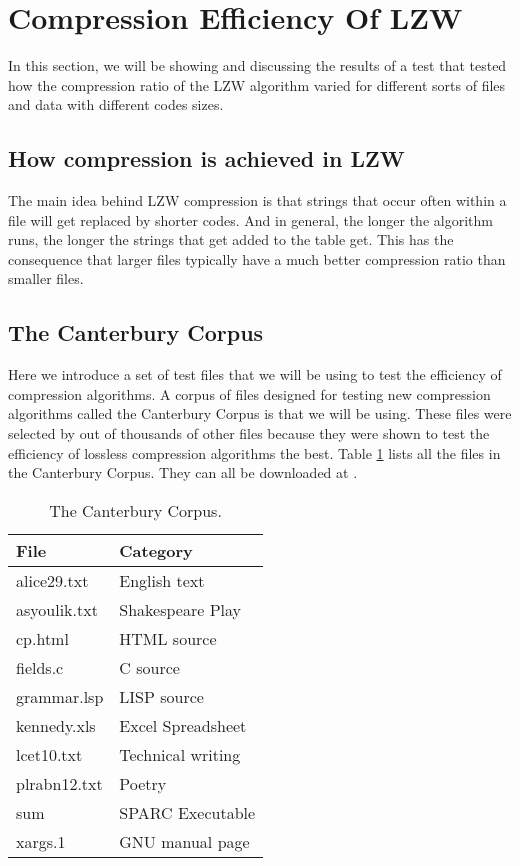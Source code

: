 \section{Compression Efficiency Of LZW}

In this section, we will be showing and discussing the results of a
test that tested how the compression ratio of the LZW algorithm varied
for different sorts of files and data with different codes sizes.

\subsection{How compression is achieved in LZW}

The main idea behind LZW compression is that strings that occur often
within a file will get replaced by shorter codes. And in general, the
longer the algorithm runs, the longer the strings that get added to
the table get. This has the consequence that larger files typically
have a much better compression ratio than smaller files.

\subsection{The Canterbury Corpus}

Here we introduce a set of test files that we will be using to test
the efficiency of compression algorithms. A corpus of files designed
for testing new compression algorithms called the Canterbury Corpus is
that we will be using. These files were selected by
\cite{arnold:corpus} out of thousands of other files because they were
shown to test the efficiency of lossless compression algorithms the
best. Table \ref{tab:corp-files} lists all the files in the Canterbury
Corpus. They can all be downloaded at \cite{powell:desc-corp}.

\begin{table}
  \centering
  \begin{tabular}{ll}
    \toprule
    File & Category \\
    \midrule
    alice29.txt & English text \\
    asyoulik.txt & Shakespeare Play \\
    cp.html & HTML source \\
    fields.c & C source \\
    grammar.lsp & LISP source \\
    kennedy.xls & Excel Spreadsheet \\
    lcet10.txt & Technical writing \\
    plrabn12.txt & Poetry \\
    sum & SPARC Executable \\
    xargs.1 & GNU manual page \\
    \bottomrule

  \end{tabular}
  \caption{The Canterbury Corpus.}
  \label{tab:corp-files}
\end{table}

